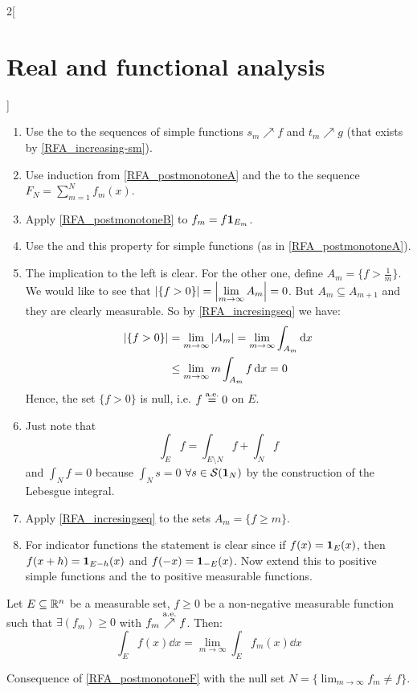 \documentclass[../../../main_math.tex]{subfiles}
\begin{document}
\begin{multicols}{2}[\section{Real and functional analysis}]
\begin{sproof}
    \begin{enumerate}
      \item Use the  to the sequences of simple functions $s_m\nearrow f$ and $t_m\nearrow g$ (that exists by \cref{RFA_increasing-sm}).
      \item Use induction from \cref{RFA_postmonotoneA} and the  to the sequence $F_N=\sum_{m=1}^N f_m(x)$.
      \item Apply \cref{RFA_postmonotoneB} to $f_m=f\boldsymbol{\mathrm{1}}_{E_m}$.
      \item Use the  and this property for simple functions (as in \cref{RFA_postmonotoneA}).
      \item The implication to the left is clear. For the other one, define $A_m=\{f>\frac{1}{m}\}$. We would like to see that $\displaystyle\m{\{f>0\}}=\m{\lim_{m\to\infty}A_m}=0$. But $A_{m}\subseteq A_{m+1}$ and they are clearly measurable. So by \cref{RFA_incresingseq} we have:
            \begin{align*}
              \displaystyle\m{\{f>0\}} & =\lim_{m\to\infty} \m{A_m}=\lim_{m\to\infty} \int_{A_m}\dd{x} \\
                                       & \leq\lim_{m\to\infty} m\int_{A_m}f\dd{x}=0
            \end{align*}
            Hence, the set $\{f>0\}$ is null, i.e. $f\overset{\text{a.e.}}{=}0$ on $E$.
      \item Just note that $$\int_Ef=\int_{E\setminus N} f+\int_N f$$ and $\int_Nf=0$ because $\int_Ns=0$ $\forall s\in\mathcal{S}(\boldsymbol{\mathrm{1}}_{N})$ by the construction of the Lebesgue integral.
      \item Apply \cref{RFA_incresingseq} to the sets $A_m=\{f\geq m\}$.
      \item For indicator functions the statement is clear since if $f(x)=\boldsymbol{\mathrm{1}}_{E}(x)$, then $f(x+h)=\boldsymbol{\mathrm{1}}_{E-h}(x)$ and $f(-x)=\boldsymbol{\mathrm{1}}_{-E}(x)$. Now extend this to positive simple functions and the to positive measurable functions.
    \end{enumerate}
  \end{sproof}
  \begin{corollary}
    Let $E\subseteq\mathbb{R}^n$ be a measurable set, $f\geq 0$ be a non-negative measurable function such that $\exists (f_m)\geq 0$ with $f_m\overset{\text{a.e.}}{\nearrow} f$. Then: $$\int_Ef(x)\dd{x}=\lim_{m\to\infty}\int_Ef_m(x)\dd{x}$$
  \end{corollary}
  \begin{sproof}
    Consequence of \cref{RFA_postmonotoneF} with the null set $N=\{\displaystyle\lim_{m\to\infty} f_m\ne f\}$.

\end{sproof}
\end{multicols}
\end{document}
